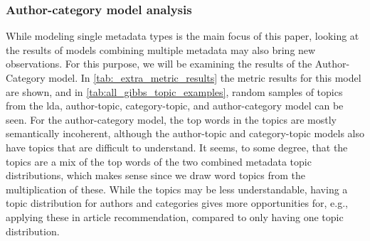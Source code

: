 \subsubsection*{Author-category model analysis}
While modeling single metadata types is the main focus of this paper, looking at the results of models combining multiple metadata may also bring new observations.
For this purpose, we will be examining the results of the Author-Category model.
In \autoref{tab:_extra_metric_results} the metric results for this model are shown, and in \autoref{tab:all_gibbs_topic_examples}, random samples of topics from the \gls{lda}, author-topic, category-topic, and author-category model can be seen.
For the author-category model, the top words in the topics are mostly semantically incoherent, although the author-topic and category-topic models also have topics that are difficult to understand.
It seems, to some degree, that the topics are a mix of the top words of the two combined metadata topic distributions, which makes sense since we draw word topics from the multiplication of these.
While the topics may be less understandable, having a topic distribution for authors and categories gives more opportunities for, e.g., applying these in article recommendation, compared to only having one topic distribution.
